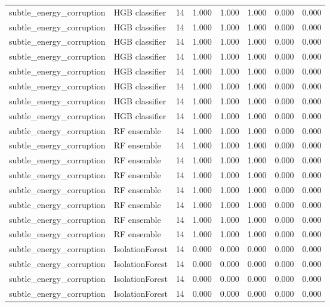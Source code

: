 {\begin{longtable}{llrrrrrr}
subtle\_energy\_corruption & HGB classifier & 14 & 1.000 & 1.000 & 1.000 & 0.000 & 0.000 \\
subtle\_energy\_corruption & HGB classifier & 14 & 1.000 & 1.000 & 1.000 & 0.000 & 0.000 \\
subtle\_energy\_corruption & HGB classifier & 14 & 1.000 & 1.000 & 1.000 & 0.000 & 0.000 \\
subtle\_energy\_corruption & HGB classifier & 14 & 1.000 & 1.000 & 1.000 & 0.000 & 0.000 \\
subtle\_energy\_corruption & HGB classifier & 14 & 1.000 & 1.000 & 1.000 & 0.000 & 0.000 \\
subtle\_energy\_corruption & HGB classifier & 14 & 1.000 & 1.000 & 1.000 & 0.000 & 0.000 \\
subtle\_energy\_corruption & HGB classifier & 14 & 1.000 & 1.000 & 1.000 & 0.000 & 0.000 \\
subtle\_energy\_corruption & HGB classifier & 14 & 1.000 & 1.000 & 1.000 & 0.000 & 0.000 \\
subtle\_energy\_corruption & RF ensemble & 14 & 1.000 & 1.000 & 1.000 & 0.000 & 0.000 \\
subtle\_energy\_corruption & RF ensemble & 14 & 1.000 & 1.000 & 1.000 & 0.000 & 0.000 \\
subtle\_energy\_corruption & RF ensemble & 14 & 1.000 & 1.000 & 1.000 & 0.000 & 0.000 \\
subtle\_energy\_corruption & RF ensemble & 14 & 1.000 & 1.000 & 1.000 & 0.000 & 0.000 \\
subtle\_energy\_corruption & RF ensemble & 14 & 1.000 & 1.000 & 1.000 & 0.000 & 0.000 \\
subtle\_energy\_corruption & RF ensemble & 14 & 1.000 & 1.000 & 1.000 & 0.000 & 0.000 \\
subtle\_energy\_corruption & RF ensemble & 14 & 1.000 & 1.000 & 1.000 & 0.000 & 0.000 \\
subtle\_energy\_corruption & RF ensemble & 14 & 1.000 & 1.000 & 1.000 & 0.000 & 0.000 \\
subtle\_energy\_corruption & IsolationForest & 14 & 0.000 & 0.000 & 0.000 & 0.000 & 0.000 \\
subtle\_energy\_corruption & IsolationForest & 14 & 0.000 & 0.000 & 0.000 & 0.000 & 0.000 \\
subtle\_energy\_corruption & IsolationForest & 14 & 0.000 & 0.000 & 0.000 & 0.000 & 0.000 \\
subtle\_energy\_corruption & IsolationForest & 14 & 0.000 & 0.000 & 0.000 & 0.000 & 0.000 \\

\end{longtable}}
